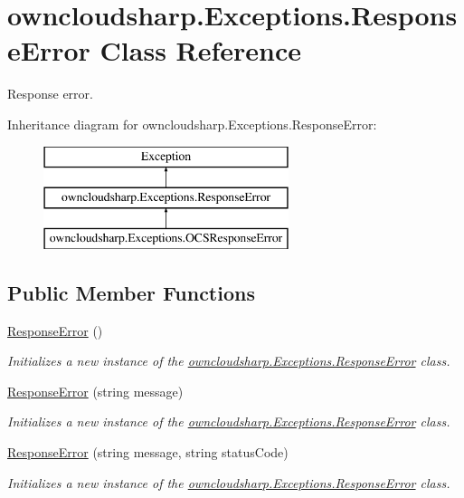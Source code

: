 \hypertarget{classowncloudsharp_1_1_exceptions_1_1_response_error}{}\section{owncloudsharp.\+Exceptions.\+Response\+Error Class Reference}
\label{classowncloudsharp_1_1_exceptions_1_1_response_error}


Response error.  


Inheritance diagram for owncloudsharp.\+Exceptions.\+Response\+Error\+:\begin{figure}[H]
\begin{center}
\leavevmode
\includegraphics[height=3.000000cm]{classowncloudsharp_1_1_exceptions_1_1_response_error}
\end{center}
\end{figure}
\subsection*{Public Member Functions}
\begin{DoxyCompactItemize}
\item 
\hyperlink{classowncloudsharp_1_1_exceptions_1_1_response_error_adb1ae6b0d1d79b9bcbc9377972fcc6d3}{Response\+Error} ()
\begin{DoxyCompactList}\small\item\em Initializes a new instance of the \hyperlink{classowncloudsharp_1_1_exceptions_1_1_response_error}{owncloudsharp.\+Exceptions.\+Response\+Error} class. \end{DoxyCompactList}\item 
\hyperlink{classowncloudsharp_1_1_exceptions_1_1_response_error_a6cc937c53060ad2da8d93396fa63803d}{Response\+Error} (string message)
\begin{DoxyCompactList}\small\item\em Initializes a new instance of the \hyperlink{classowncloudsharp_1_1_exceptions_1_1_response_error}{owncloudsharp.\+Exceptions.\+Response\+Error} class. \end{DoxyCompactList}\item 
\hyperlink{classowncloudsharp_1_1_exceptions_1_1_response_error_a9c7dcb21a9f787b2085421421f6341aa}{Response\+Error} (string message, string status\+Code)
\begin{DoxyCompactList}\small\item\em Initializes a new instance of the \hyperlink{classowncloudsharp_1_1_exceptions_1_1_response_error}{owncloudsharp.\+Exceptions.\+Response\+Error} class. \end{DoxyCompactList}\end{DoxyCompactItemize}
